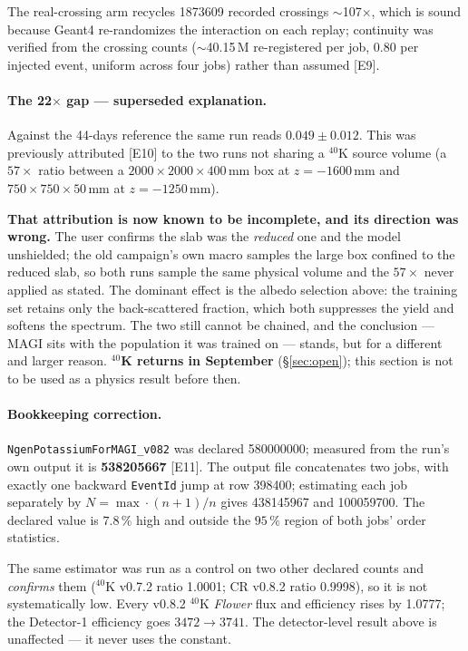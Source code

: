 \documentclass[11pt,a4paper]{article}
\newcommand{\ev}[1]{{\footnotesize\textcolor{prov}{[#1]}}}
\begin{document}
The real-crossing arm recycles \num{1873609} recorded crossings $\sim$107$\times$,
which is sound because Geant4 re-randomizes the interaction on each replay;
continuity was verified from the crossing counts ($\sim$40.15\,M re-registered
per job, 0.80 per injected event, uniform across four jobs) rather than assumed
\ev{E9}.

\paragraph{The 22$\times$ gap --- superseded explanation.}
Against the 44-days reference the same run reads $0.049 \pm 0.012$. This was
previously attributed \ev{E10} to the two runs not sharing a $^{40}$K source
volume (a $57\times$ ratio between a $2000\times2000\times400$\,mm box at
$z=-1600$\,mm and $750\times750\times50$\,mm at $z=-1250$\,mm).

\textbf{That attribution is now known to be incomplete, and its direction was
wrong.} The user confirms the slab was the \emph{reduced} one and the model
unshielded; the old campaign's own macro samples the large box confined to the
reduced slab, so both runs sample the same physical volume and the $57\times$
never applied as stated. The dominant effect is the albedo selection above: the
training set retains only the back-scattered fraction, which both suppresses the
yield and softens the spectrum. The two still cannot be chained, and the
conclusion --- MAGI sits with the population it was trained on --- stands, but
for a different and larger reason. \textbf{$^{40}$K returns in September}
(\S\ref{sec:open}); this section is not to be used as a physics result before then.

\paragraph{Bookkeeping correction.}
\texttt{NgenPotassiumForMAGI\_v082} was declared \num{580000000}; measured from
the run's own output it is \textbf{\num{538205667}} \ev{E11}. The output file
concatenates two jobs, with exactly one backward \texttt{EventId} jump at row
\num{398400}; estimating each job separately by $N = \max\cdot(n+1)/n$ gives
\num{438145967} and \num{100059700}. The declared value is $7.8\,\%$ high and
outside the $95\,\%$ region of both jobs' order statistics.

The same estimator was run as a control on two other declared counts and
\emph{confirms} them ($^{40}$K v0.7.2 ratio 1.0001; CR v0.8.2 ratio 0.9998),
so it is not systematically low. Every v0.8.2 $^{40}$K \emph{Flower} flux and
efficiency rises by 1.0777; the Detector-1 efficiency goes $3472 \to 3741$.
The detector-level result above is unaffected --- it never uses the constant.
\end{document}
